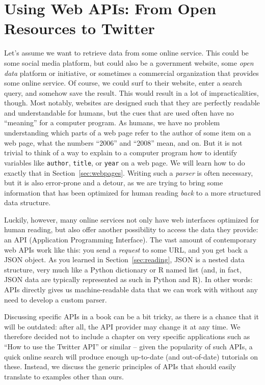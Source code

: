 %

\section{Using Web APIs: From Open Resources to Twitter}
\label{sec:apis}

Let's assume we want to retrieve data from some online service. This
could be some social media platform, but could also be a government website,
some \emph{open data} platform or initiative, or sometimes a
commercial organization that provides some online service.  Of course,
we could surf to their website, enter a search query, and somehow save
the result. This would result in a lot of impracticalities,
though. Most notably, websites are designed such that they are
perfectly readable and understandable for humans, but the cues that
are used often have no ``meaning'' for a computer program. As humans,
we have no problem understanding which parts of a web page refer to
the author of some item on a web page, what the numbers ``2006'' and
``2008'' mean, and on. But it is not trivial to think of a way to
explain to a computer program how to identify variables like
\texttt{author}, \texttt{title}, or \texttt{year} on a web page.
We will learn how to do exactly that in Section~\ref{sec:webpages}. Writing
such a \emph{parser} is often necessary, but it is also error-prone
and  a detour, as we are trying to bring some information
that has been optimized for human reading \emph{back} to a more
structured data structure.

Luckily, however, many online services  not only have web interfaces
optimized for human reading, but also offer another possibility to
access the data they provide: an API (Application Programming
Interface).
The vast amount of contemporary web APIs work like this: you send a
\emph{request} to some URL, and you get back a  JSON object. As you
learned in Section~\ref{sec:reading}, JSON is a nested data structure, very
much like a Python dictionary or R named list (and, in fact, JSON data are typically 
represented as such in Python and R). In other words: APIs directly
gives us machine-readable data that we can work with without any need
to develop a custom parser.

Discussing specific APIs in a book can be a bit tricky, as there is a
chance that it will be outdated: after all, the API provider may change
it at any time. We therefore decided not to include a chapter on very
specific applications such as ``How to use the Twitter API'' or similar --
given the popularity of such APIs, a quick online search will produce
enough up-to-date (and out-of-date) tutorials on these. Instead,
we discuss the generic principles of APIs that should easily translate
to  examples other than ours.


